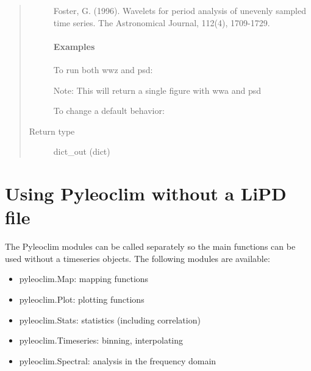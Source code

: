 \documentclass[letterpaper,10pt,english]{sphinxmanual}
\begin{document}
\begin{fulllineitems}
\begin{quote}
\begin{description}
Foster, G. (1996). Wavelets for period analysis of unevenly
sampled time series. The Astronomical Journal, 112(4), 1709-1729.
\paragraph{Examples}

To run both wwz and psd:

\begin{sphinxVerbatim}[commandchars=\\\{\}]
   
\end{sphinxVerbatim}

Note: This will return a single figure with wwa and psd

To change a default behavior:

\begin{sphinxVerbatim}[commandchars=\\\{\}]
     
\end{sphinxVerbatim}


\item[{Return type}] \leavevmode
dict\_out (dict)

\end{description}\end{quote}

\end{fulllineitems}



\section{Using Pyleoclim without a LiPD file}
\label{\detokenize{Main:using-pyleoclim-without-a-lipd-file}}
The Pyleoclim modules can be called separately so the main functions can be used without a timeseries objects.
The following modules are available:
\begin{itemize}
\item {} 
pyleoclim.Map: mapping functions

\item {} 
pyleoclim.Plot: plotting functions

\item {} 
pyleoclim.Stats: statistics (including correlation)

\item {} 
pyleoclim.Timeseries: binning, interpolating

\item {} 
pyleoclim.Spectral: analysis in the frequency domain

\end{itemize}
\end{document}
